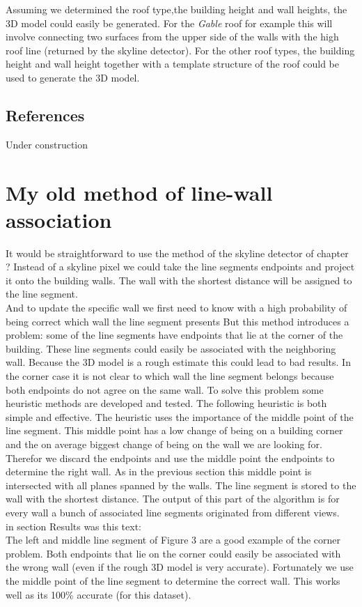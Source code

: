 Assuming we determined the roof type,the building height and wall heights, the 3D model could 
easily be generated. For the \emph{Gable} roof for example this will involve
connecting two surfaces from the upper side of the walls with the high roof line (returned by the
skyline detector). For the other roof types, the building height and wall
height together with a template structure of the roof could be used to generate the 3D
model.


\subsection{References}
Under construction


\section{My old method of line-wall association}
It would be straightforward to use the method of the skyline detector of
chapter ?%
Instead of a skyline pixel we could take the line segments
endpoints and project it onto the building walls. The wall with the shortest
distance will be assigned to the line segment.\\

And to update the specific wall we first need to know with a high probability of being correct which wall the line segment presents
But this method introduces a problem: some of the line segments have endpoints that lie at the corner of the building. These line segments could easily be associated with the neighboring wall. Because the 3D model is a rough estimate this could lead to bad results.
In the corner case it is not clear to which wall the line segment belongs because both endpoints do not agree on the same wall. To solve this problem some heuristic methods are developed and tested. The following heuristic is both simple and effective.
The heuristic uses the importance of the middle point of the line segment. This middle point has a low change of being on a building corner and the on average biggest change of being on the wall we are looking for.
Therefor we discard the endpoints and use the middle point the endpoints to determine the right wall.
As in the previous section %
this middle point is intersected with all planes spanned by the walls. The line segment is stored to the wall with the shortest distance.
The output of this part of the algorithm is for every wall a bunch of associated line segments originated from different views.\\

in section Results was this text:\\
The left and middle line segment of Figure 3 %
are
a good example of the corner problem. Both endpoints that lie on the corner could easily be associated
with the wrong wall (even if the rough 3D model is very accurate). Fortunately
we use the middle point of the line segment to determine the correct wall. This
works well as its 100\% accurate (for this dataset).



